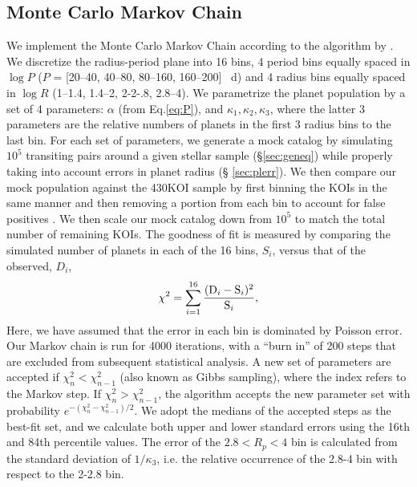 \subsection{Monte Carlo Markov Chain}
\label{sec:mcmc}
We implement the Monte Carlo Markov Chain according to the 
algorithm by \citet{Gelman92}.
We discretize the radius-period plane into 16 bins, 4 period bins
equally spaced in $\log P$ ($P$ = [20--40, 40--80, 80--160, 160--200]
~d) and 4 radius bins equally spaced in $\log R$ (1--1.4\rearth{},
1.4--2\rearth{}, 2-2-.8\rearth{}, 2.8--4\rearth{}). We parametrize the
planet population by a set of 4 parameters: $\alpha$ (from
Eq.\ref{eq:P}), and $\kappa_1, \kappa_2, \kappa_3$, where the
latter 3 parameters are the relative numbers of planets in the first
3 radius bins to the last bin. For each set of
parameters, we generate a mock catalog by simulating $10^5$
transiting pairs around a given stellar sample (\S \ref{sec:geneq})
while properly taking into account errors in planet radius (\S
\ref{sec:plerr}).  We then compare our mock population against
the 430KOI sample by first binning the KOIs in the same manner and then removing 
a portion from each bin to account for false positives 
\citep[Table 1 from][]{Fressin2013}. We then scale our mock catalog 
down from $10^5$ to match the total number of remaining KOIs. 
The goodness of fit is measured by comparing the simulated number of
planets in each of the 16 bins, $S_i$, versus that of the
observed, $D_i$,
\begin{equation}
\chi^2=\sum\limits_{i=1}^{16} \frac{({\rm D}_i - {\rm S}_i)^2}{{\rm S}_i}, 
\end{equation}
Here, we have assumed that the error in each bin is dominated by 
Poisson error. Our Markov chain is run for 4000 iterations, with a
``burn in'' of 200 steps that are excluded from subsequent statistical 
analysis. A new set of parameters are accepted if $\chi^2_{n} <
\chi^2_{n-1}$ (also known as Gibbs sampling), where the index refers to the Markov step.  If
$\chi^2_{n} > \chi^2_{n-1}$, the algorithm accepts the new parameter
set with probability $e^{-(\chi^2_{n} - \chi^2_{n-1})/2}$.  We 
adopt the medians of the accepted steps as the best-fit set, and we
calculate both upper and lower standard errors using the
16th and 84th percentile values. The error of the $2.8<R_p<4$ bin 
is calculated from the standard deviation of $1/\kappa_3$, i.e. 
the relative occurrence of the 2.8-4\rearth{} bin with respect to 
the 2-2.8\rearth{} bin.

